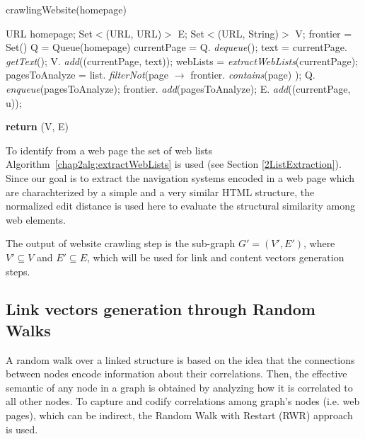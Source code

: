 \begin{algorithm}[tb]
\caption{crawlingWebsite(homepage)}
\label{3alg:crawlingWebsite}
\begin{algorithmic}[1]
\renewcommand{\algorithmicrequire}{\textbf{Input:}}
\renewcommand{\algorithmicensure}{\textbf{Output:}}
\renewcommand{\algorithmiccomment}[1]{$//$ \textit{#1}}
\renewcommand{\algorithmicforall}{\textbf{for each}}
\newcommand{\extractWebLists}[1]{ \textit{extractWebLists}(#1); }
\newcommand{\filterNot}[1]{ \textit{filterNot}(#1); }
\newcommand{\dequeue}[1]{ \textit{dequeue}(#1); }
\newcommand{\getText}[1]{ \textit{getText}(#1); }
\newcommand{\contains}[1]{ \textit{contains}(#1) }
\newcommand{\add}[1]{ \textit{add}(#1); }
\newcommand{\enqueue}[1]{ \textit{enqueue}(#1); }
\newcommand{\RETURN}[1]{\textbf{return} #1}

\REQUIRE URL homepage;
\ENSURE Set$<$(URL, URL)$>$ E; Set$<$(URL, String)$>$ V;
\STATE frontier = Set()
\STATE Q = Queue(homepage)
\REPEAT 
	\STATE currentPage = Q.\dequeue{}
	\STATE text = currentPage.\getText{}
	\STATE V.\add{(currentPage, text)}
	\STATE webLists = \extractWebLists{currentPage}
		\STATE pagesToAnalyze = list.\filterNot{page $\rightarrow$ frontier.\contains{page}}
		\STATE Q.\enqueue{pagesToAnalyze}
		\STATE frontier.\add{pagesToAnalyze}
		\STATE E.\add{(currentPage, u)}
		\ENDFOR

 	\ENDFOR
{}
\RETURN {(V, E)}

\end{algorithmic}
\end{algorithm}
To identify from a web page the set of web lists Algorithm~\ref{chap2alg:extractWebLists} is used (see Section \ref{2ListExtraction}). Since our goal is to extract the navigation systems encoded in a web page which are charachterized by a simple and a very similar HTML structure, the normalized edit distance is used here to evaluate the structural similarity among web elements.

The output of website crawling step is the sub-graph $G' = (V', E')$, where $V'\subseteq V$ and $E' \subseteq E$, which will be used for link and content vectors generation steps.




\subsection{Link vectors generation through Random  Walks}
\label{sec:linkGen}
A random walk over a linked structure is based on the idea that the connections between nodes encode information about their correlations. Then, the effective semantic of any node in a graph is obtained by  analyzing how it is correlated to all other nodes. 
To capture and codify correlations among graph's nodes (i.e. web pages), which can be indirect, the Random Walk with Restart (RWR) approach is used. 
 
